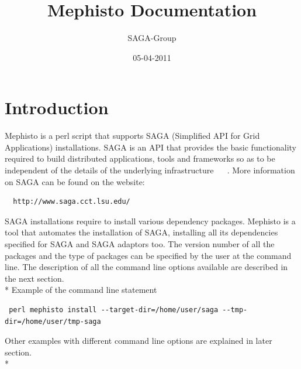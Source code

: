 \documentclass[a4paper,10pt]{article}
\newcommand{\jhanote}[1]{  {\textcolor{red}     { ***Shantenu: #1 }}}
\newcommand{\jhanote}[1]{}
\begin{document}
 \title{ \Large \vspace{-3.5em} Mephisto Documentation }
 
 \author{ SAGA-Group}
 \date{05-04-2011}
 \maketitle
 




\section*{Introduction}
Mephisto is a perl script that supports SAGA (Simplified API for Grid Applications) 
installations. SAGA is an API that provides the basic functionality required to build 
distributed applications, tools and frameworks so as to be independent of the details 
of the underlying infrastructure ~\cite{saga-home} ~\cite{saga-tools}. More information
on SAGA can be found on the website:
\begin{verbatim}
  http://www.saga.cct.lsu.edu/
\end{verbatim}
SAGA installations require to install various dependency packages. 
Mephisto is a tool that automates the installation of SAGA, installing 
all its dependencies specified for SAGA and SAGA adaptors too.  
The version number of all the packages and the type of packages can 
be specified by the user at the command line. The description 
of all the command line options available are described 
in the next section.\\*
Example of the command line statement  
\begin{verbatim} perl mephisto install --target-dir=/home/user/saga --tmp-dir=/home/user/tmp-saga \end{verbatim}
Other examples with different command line options are explained in later section. \\*
\end{document}
